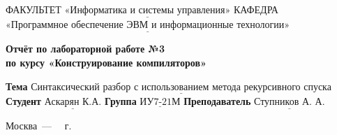 \begin{titlepage}
	
	\noindent ФАКУЛЬТЕТ $\underline{\text{«Информатика и системы управления»}}$ \newline\newline
	\noindent КАФЕДРА $\underline{\text{«Программное обеспечение ЭВМ и информационные технологии»}}$\newline\newline\newline\newline\newline\newline\newline
	
	\vspace{\baselineskip}

	\begin{center}
		\Large\textbf{Отчёт по лабораторной работе №3} \\
		\Large\textbf{по курсу «Конструирование компиляторов»} \\

	\end{center}
	\begin{center}
		\large{}
	\end{center}
	\vspace{2.5cm}
	
	\noindent\textbf{Тема} $\underline{\text{Синтаксический разбор с использованием метода рекурсивного спуска}}$\newline\newline
	\noindent\textbf{Студент} $\underline{\text{Аскарян К.А.}}$\newline\newline
	\noindent\textbf{Группа} $\underline{\text{ИУ7-21М}}$\newline\newline
	\noindent\textbf{Преподаватель} $\underline{\text{Ступников~А.~А.}}$\newline
	
	\begin{center}
		\vfill
		Москва~---~\the\year
		~г.
	\end{center}
	\restoregeometry
\end{titlepage}